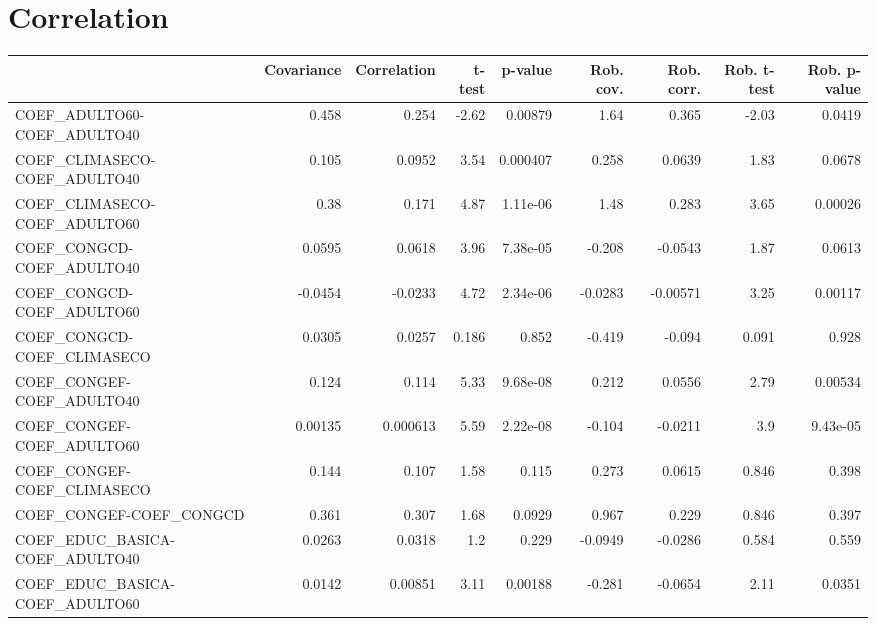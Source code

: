 \section{Correlation}
\begin{tabular}{lrrrrrrrr}
\toprule
{} &  Covariance &  Correlation &   t-test &  p-value &  Rob. cov. &  Rob. corr. &  Rob. t-test &  Rob. p-value \\
\midrule
COEF\_ADULTO60-COEF\_ADULTO40           &       0.458 &        0.254 &    -2.62 &  0.00879 &       1.64 &       0.365 &        -2.03 &        0.0419 \\
COEF\_CLIMASECO-COEF\_ADULTO40          &       0.105 &       0.0952 &     3.54 & 0.000407 &      0.258 &      0.0639 &         1.83 &        0.0678 \\
COEF\_CLIMASECO-COEF\_ADULTO60          &        0.38 &        0.171 &     4.87 & 1.11e-06 &       1.48 &       0.283 &         3.65 &       0.00026 \\
COEF\_CONGCD-COEF\_ADULTO40             &      0.0595 &       0.0618 &     3.96 & 7.38e-05 &     -0.208 &     -0.0543 &         1.87 &        0.0613 \\
COEF\_CONGCD-COEF\_ADULTO60             &     -0.0454 &      -0.0233 &     4.72 & 2.34e-06 &    -0.0283 &    -0.00571 &         3.25 &       0.00117 \\
COEF\_CONGCD-COEF\_CLIMASECO            &      0.0305 &       0.0257 &    0.186 &    0.852 &     -0.419 &      -0.094 &        0.091 &         0.928 \\
COEF\_CONGEF-COEF\_ADULTO40             &       0.124 &        0.114 &     5.33 & 9.68e-08 &      0.212 &      0.0556 &         2.79 &       0.00534 \\
COEF\_CONGEF-COEF\_ADULTO60             &     0.00135 &     0.000613 &     5.59 & 2.22e-08 &     -0.104 &     -0.0211 &          3.9 &      9.43e-05 \\
COEF\_CONGEF-COEF\_CLIMASECO            &       0.144 &        0.107 &     1.58 &    0.115 &      0.273 &      0.0615 &        0.846 &         0.398 \\
COEF\_CONGEF-COEF\_CONGCD               &       0.361 &        0.307 &     1.68 &   0.0929 &      0.967 &       0.229 &        0.846 &         0.397 \\
COEF\_EDUC\_BASICA-COEF\_ADULTO40        &      0.0263 &       0.0318 &      1.2 &    0.229 &    -0.0949 &     -0.0286 &        0.584 &         0.559 \\
COEF\_EDUC\_BASICA-COEF\_ADULTO60        &      0.0142 &      0.00851 &     3.11 &  0.00188 &     -0.281 &     -0.0654 &         2.11 &        0.0351 \\

\end{tabular}
